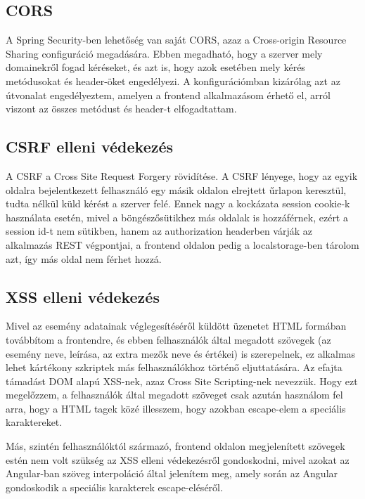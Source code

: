 \documentclass[a4paper,12pt]{report}
\theoremstyle{definition}
\theoremstyle{remark}
\begin{document}
	\subsection{CORS}

A Spring Security-ben lehetőség van saját CORS, azaz a Cross-origin Resource Sharing\cite{Corswebsite} configuráció megadására. Ebben megadható, hogy a szerver mely domainekről fogad kéréseket, és azt is, hogy azok esetében mely kérés metódusokat és header-öket engedélyezi. A konfigurációmban kizárólag azt az útvonalat engedélyeztem, amelyen a frontend alkalmazásom érhető el, arról viszont az összes metódust és header-t elfogadtattam.


	\subsection{CSRF elleni védekezés}

A CSRF a Cross Site Request Forgery rövidítése. A CSRF lényege, hogy az egyik oldalra bejelentkezett felhasználó egy másik oldalon elrejtett űrlapon keresztül, tudta nélkül küld kérést a szerver felé\cite{Infbiztwebsite}. Ennek nagy a kockázata session cookie-k használata esetén, mivel a böngészősütikhez más oldalak is hozzáférnek, ezért a session id-t nem sütikben, hanem az authorization headerben várják az alkalmazás REST végpontjai, a frontend oldalon pedig a localstorage-ben tárolom azt, így más oldal nem férhet hozzá.


	\subsection{XSS elleni védekezés}

Mivel az esemény adatainak véglegesítéséről küldött üzenetet HTML formában továbbítom a frontendre, és ebben felhasználók által megadott szövegek (az esemény neve, leírása, az extra mezők neve és értékei) is szerepelnek, ez alkalmas lehet kártékony szkriptek más felhasználókhoz történő eljuttatására. Az efajta támadást DOM alapú XSS-nek, azaz Cross Site Scripting-nek nevezzük\cite{Infbiztwebsite}. Hogy ezt megelőzzem, a felhasználók által megadott szöveget csak azután használom fel arra, hogy a HTML tagek közé illesszem, hogy azokban escape-elem a speciális karaktereket.

Más, szintén felhasználóktól származó, frontend oldalon megjelenített szövegek estén nem volt szükség az XSS elleni védekezésről gondoskodni, mivel azokat az Angular-ban szöveg interpoláció által jelenítem meg, amely során az Angular gondoskodik a speciális karakterek escape-eléséről\cite{Angularxsswebsite}.
\end{document}
